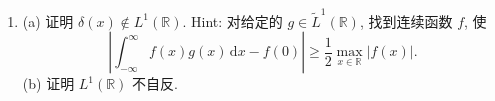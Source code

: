 \begin{enumerate}[label=\thesection.\arabic*.,ref=\thesection.\arabic*,start=24,series=book-problems]
\item\label{ex:dirac-not-l-one-and-l-one-nonreflexivity} (a) 证明 $\delta(x)\notin L^1(\mathbb{R})$. Hint: 对给定的 $g\in\widetilde L^1(\mathbb{R})$, 找到连续函数 $f$, 使
\begin{equation}\label{eq:dirac-not-l-one-continuous-test-separation}
\left|\int_{-\infty}^{\infty}f(x)g(x)\,\mathrm{d}x-f(0)\right|\geq\dfrac{1}{2}\max_{x\in\mathbb{R}}|f(x)|.
\end{equation}
(b) 证明 $L^1(\mathbb{R})$ 不自反.

\end{enumerate}
